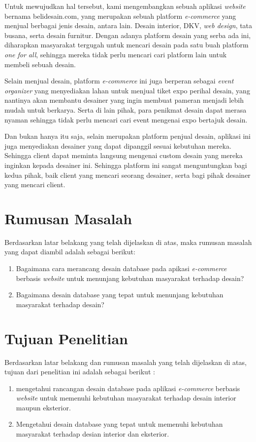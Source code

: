 \par
Untuk mewujudkan hal tersebut, kami mengembangkan sebuah aplikasi \textit{website} bernama belidesain.com, yang merupakan sebuah platform \textit{e-commerce} yang menjual berbagai jenis desain, antara lain. Desain interior, DKV, \textit{web design}, tata busana, serta desain furnitur. Dengan adanya platform desain yang serba ada ini, diharapkan masyarakat tergugah untuk mencari desain pada satu buah platform \textit{one for all}, sehingga mereka tidak perlu mencari cari platform lain untuk membeli sebuah desain.
\par
Selain menjual desain, platform \textit{e-commerce} ini juga berperan sebagai \textit{event organizer} yang menyediakan lahan untuk menjual tiket expo perihal desain, yang nantinya akan membantu desainer yang ingin membuat pameran menjadi lebih mudah untuk berkarya. Serta di lain pihak, para penikmat desain dapat merasa nyaman sehingga tidak perlu mencari cari event mengenai expo bertajuk desain.
\par
Dan bukan hanya itu saja, selain merupakan platform penjual desain, aplikasi ini juga menyediakan desainer yang dapat dipanggil sesuai kebutuhan mereka. Sehingga client dapat meminta langsung mengenai custom desain yang mereka inginkan kepada desainer ini. Sehingga platform ini sangat menguntungkan bagi kedua pihak, baik client yang mencari seorang desainer, serta bagi pihak desainer yang mencari client.

\section{Rumusan Masalah}
Berdasarkan latar belakang yang telah dijelaskan di atas, maka rumusan masalah yang dapat diambil adalah sebagai berikut:
\begin{enumerate}
	\item Bagaimana cara merancang desain database pada apikasi \textit{e-commerce} berbasis \textit{website} untuk menunjang kebutuhan masyarakat terhadap desain?
	\item Bagaimana desain database yang tepat untuk menunjang  kebutuhan masyarakat terhadap desain?
\end{enumerate}

\section{Tujuan Penelitian}
Berdasarkan latar belakang dan rumusan masalah yang telah dijelaskan di atas, tujuan dari penelitian ini adalah sebagai berikut :
\begin{enumerate}
	\item mengetahui rancangan desain database pada aplikasi \textit{e-commerce} berbasis \textit{website} untuk memenuhi kebutuhan masyarakat terhadap desain interior maupun eksterior.
	\item Mengetahui desain database yang tepat untuk memenuhi kebutuhan masyarakat terhadap desian interior dan eksterior.
\end{enumerate}

